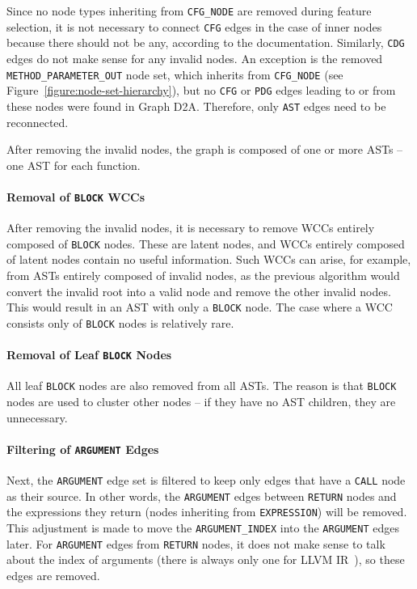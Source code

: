 Since no node types inheriting from \texttt{CFG\_NODE} are removed during feature selection, it is not necessary to connect \texttt{CFG} edges in the case of inner nodes because there should not be any, according to the documentation. Similarly, \texttt{CDG} edges do not make sense for any invalid nodes. An exception is the removed \texttt{METHOD\_PARAMETER\_OUT} node set, which inherits from \texttt{CFG\_NODE} (see Figure~\ref{figure:node-set-hierarchy}), but no \texttt{CFG} or \texttt{PDG} edges leading to or from these nodes were found in Graph D2A. Therefore, only \texttt{AST} edges need to be reconnected. 

After removing the invalid nodes, the graph is composed of one or more ASTs -- one AST for each function.

\paragraph{Removal of \texttt{BLOCK} WCCs}
After removing the invalid nodes, it is necessary to remove WCCs entirely composed of \texttt{BLOCK} nodes. These are latent nodes, and WCCs entirely composed of latent nodes contain no useful information. Such WCCs can arise, for example, from ASTs entirely composed of invalid nodes, as the previous algorithm would convert the invalid root into a valid node and remove the other invalid nodes. This would result in an AST with only a \texttt{BLOCK} node. The case where a WCC consists only of \texttt{BLOCK} nodes is relatively rare.

\paragraph{Removal of Leaf \texttt{BLOCK} Nodes}
All leaf \texttt{BLOCK} nodes are also removed from all ASTs. The reason is that \texttt{BLOCK} nodes are used to cluster other nodes -- if they have no AST children, they are unnecessary.

\paragraph{Filtering of \texttt{ARGUMENT} Edges}
Next, the \texttt{ARGUMENT} edge set is filtered to keep only edges that have a \texttt{CALL} node as their source. In other words, the \texttt{ARGUMENT} edges between \texttt{RETURN} nodes and the expressions they return (nodes inheriting from \texttt{EXPRESSION}) will be removed. This adjustment is made to move the \texttt{ARGUMENT\_INDEX} into the \texttt{ARGUMENT} edges later. For \texttt{ARGUMENT} edges from \texttt{RETURN} nodes, it does not make sense to talk about the index of arguments (there is always only one for LLVM IR~\cite{LLVM-IR}), so these edges are removed.

